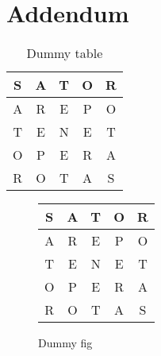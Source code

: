 \chapter{Addendum}

\lipsum[30]

\begin{table}[hbtp]
	\centering
	\begin{tabular}{|c|c|c|c|c|} \hline
        S & A & T & O & R\\ \hline
        A & R & E & P & O\\ \hline
        T & E & N & E & T\\ \hline
        O & P & E & R & A\\ \hline
        R & O & T & A & S\\ \hline
    \end{tabular}
    
    \caption{Dummy table}
    \label{tab:apptable}
\end{table}

\begin{figure}[hbtp]
	\centering
	\begin{tabular}{|c|c|c|c|c|} \hline
        S & A & T & O & R\\ \hline
        A & R & E & P & O\\ \hline
        T & E & N & E & T\\ \hline
        O & P & E & R & A\\ \hline
        R & O & T & A & S\\ \hline
    \end{tabular}
    
    \caption{Dummy fig}
    \label{fig:appfig}
\end{figure}

\lipsum[31-35]
